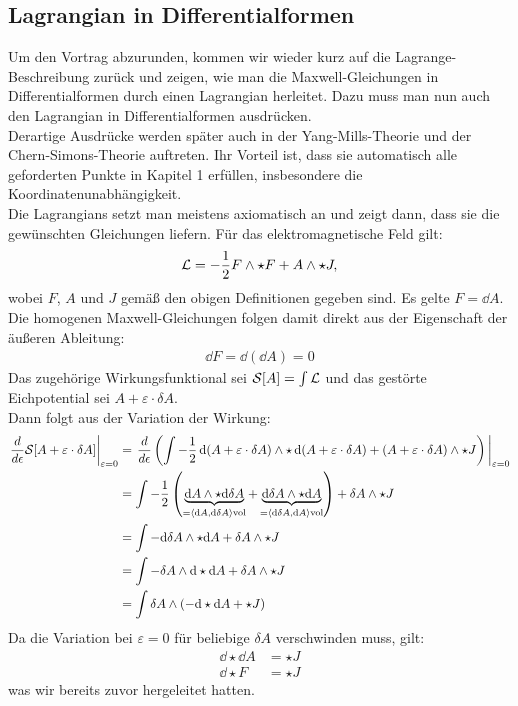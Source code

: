 \subsection{Lagrangian in Differentialformen}

Um den Vortrag abzurunden, kommen wir wieder kurz auf die Lagrange-Beschreibung zurück und zeigen, wie man die Maxwell-Gleichungen in Differentialformen durch einen Lagrangian herleitet. Dazu muss man nun auch den Lagrangian in Differentialformen ausdrücken. \\

Derartige Ausdrücke werden später auch in der Yang-Mills-Theorie und der Chern-Simons-Theorie auftreten. Ihr Vorteil ist, dass sie automatisch alle geforderten Punkte in Kapitel 1 erfüllen, insbesondere die Koordinatenunabhängigkeit. \\

Die Lagrangians setzt man meistens axiomatisch an und zeigt dann, dass sie die gewünschten Gleichungen liefern. Für das elektromagnetische Feld gilt:
\begin{align}
\mathcal{L} = - \frac{1}{2} F \wedge \star F + A \wedge \star J,
\end{align}
wobei $F$, $A$ und $J$ gemäß den obigen Definitionen gegeben sind. Es gelte $F = \dd A$. Die homogenen Maxwell-Gleichungen folgen damit direkt aus der Eigenschaft der äußeren Ableitung:
\begin{align*}
\dd F = \dd (\dd A) = 0
\end{align*}
Das zugehörige Wirkungsfunktional sei $\mathcal{S} [A]=\int \mathcal{L}$ und das gestörte Eichpotential sei $A + \varepsilon \cdot \delta A$. \\
Dann folgt aus der Variation der Wirkung: 
\begin{align*}
\eval{\frac{d}{d \epsilon} \mathcal{S}[A + \varepsilon \cdot \delta A]}_{\varepsilon=0} &= \eval{\frac{d}{d \epsilon} \left( \int - \frac{1}{2} \dd(A + \varepsilon \cdot \delta A) \w \star \dd(A + \varepsilon \cdot \delta A) + (A + \varepsilon \cdot \delta A) \w \star J \right)}_{\varepsilon=0} \\
&= \int - \frac{1}{2} \left(\underbrace{\dd A  \w \star \dd \delta A}_{=  \left< \dd A, \dd \delta A \right>\text{vol}}  + \underbrace{\dd \delta A \w \star \dd A}_{=  \left< \dd \delta A, \dd A \right>\text{vol}} \right) + \delta A \w \star J \\
&= \int - \dd \delta A \w \star \dd A + \delta A \w \star J  \\
&= \int - \delta A \w \dd \star \dd A + \delta A \w \star J \\
&= \int \delta A \w \left( - \dd \star \dd A + \star J \right)
\end{align*}
Da die Variation bei $\varepsilon = 0$ für beliebige $\delta A$ verschwinden muss, gilt: 
\begin{align*}
\dd \star \dd A &= \star J \\
\dd \star F &= \star J
\end{align*}
was wir bereits zuvor hergeleitet hatten.
